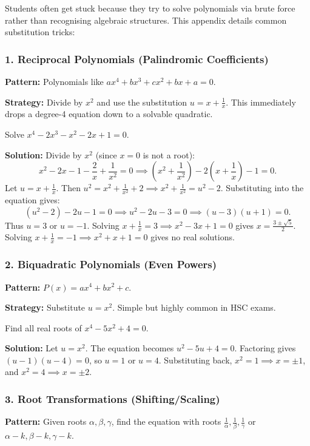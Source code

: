 \documentclass[12pt]{article}
\newenvironment{example}[1][]{%
  \begin{examplebox}[title={\bfseries Example~\thetcbcounter\ifx\relax#1\relax\else\ (#1)\fi}]%
}{%
  \end{examplebox}%
}
\begin{document}
Students often get stuck because they try to solve polynomials via brute force rather than recognising algebraic structures. This appendix details common substitution tricks:

\subsubsection*{1. Reciprocal Polynomials (Palindromic Coefficients)}
\textbf{Pattern:} Polynomials like $ax^4 + bx^3 + cx^2 + bx + a = 0$.

\textbf{Strategy:} Divide by $x^2$ and use the substitution $u = x + \frac{1}{x}$. This immediately drops a degree-4 equation down to a solvable quadratic.

\begin{example}
Solve $x^4 - 2x^3 - x^2 - 2x + 1 = 0$.

\textbf{Solution:} Divide by $x^2$ (since $x=0$ is not a root):
\[
x^2 - 2x - 1 - \frac{2}{x} + \frac{1}{x^2} = 0 \implies \left(x^2 + \frac{1}{x^2}\right) - 2\left(x + \frac{1}{x}\right) - 1 = 0.
\]
Let $u = x + \frac{1}{x}$. Then $u^2 = x^2 + \frac{1}{x^2} + 2 \implies x^2 + \frac{1}{x^2} = u^2 - 2$.
Substituting into the equation gives:
\[
(u^2 - 2) - 2u - 1 = 0 \implies u^2 - 2u - 3 = 0 \implies (u-3)(u+1) = 0.
\]
Thus $u = 3$ or $u = -1$.
Solving $x + \frac{1}{x} = 3 \implies x^2 - 3x + 1 = 0$ gives $x = \frac{3 \pm \sqrt{5}}{2}$.
Solving $x + \frac{1}{x} = -1 \implies x^2 + x + 1 = 0$ gives no real solutions.
\end{example}

\subsubsection*{2. Biquadratic Polynomials (Even Powers)}
\textbf{Pattern:} $P(x) = ax^4 + bx^2 + c$.

\textbf{Strategy:} Substitute $u = x^2$. Simple but highly common in HSC exams.

\begin{example}
Find all real roots of $x^4 - 5x^2 + 4 = 0$.

\textbf{Solution:} Let $u = x^2$. The equation becomes $u^2 - 5u + 4 = 0$.
Factoring gives $(u-1)(u-4) = 0$, so $u = 1$ or $u = 4$.
Substituting back, $x^2 = 1 \implies x = \pm 1$, and $x^2 = 4 \implies x = \pm 2$.
\end{example}

\subsubsection*{3. Root Transformations (Shifting/Scaling)}
\textbf{Pattern:} Given roots $\alpha, \beta, \gamma$, find the equation with roots $\frac{1}{\alpha}, \frac{1}{\beta}, \frac{1}{\gamma}$ or $\alpha-k, \beta-k, \gamma-k$.
\end{document}
